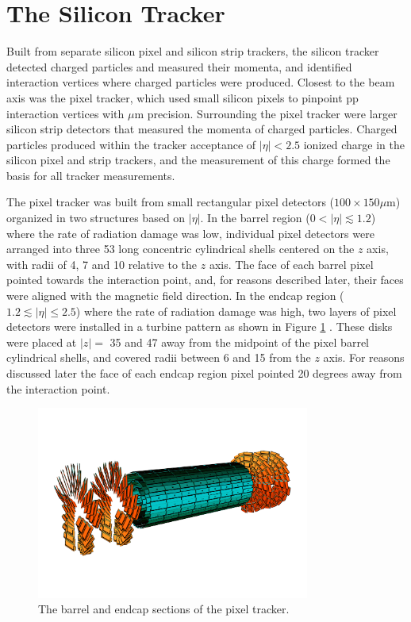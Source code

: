 \section{The Silicon Tracker}
\label{sec:siTrackerDescription}
Built from separate silicon pixel and silicon strip trackers, the silicon tracker detected charged particles  
and measured their momenta, and identified interaction vertices where charged particles were produced.  Closest 
to the beam axis was the pixel tracker, which used small silicon pixels to pinpoint pp interaction vertices 
with $\mu$m precision.  Surrounding the pixel tracker were larger silicon strip detectors that measured the 
momenta of charged particles.  Charged particles produced within the tracker acceptance of $|\eta| < 2.5$ ionized 
charge in the silicon pixel and strip trackers, and the measurement of this charge formed the basis for all tracker 
measurements.

The pixel tracker was built from small rectangular pixel detectors ($100 \times 150 \mu$m) organized in two 
structures based on $|\eta|$.  In the barrel region ($0 < |\eta| \lesssim 1.2$) where the rate of radiation damage was 
low, individual pixel detectors were arranged into three 53 \cm long concentric cylindrical shells centered on the 
$z$ axis, with radii of 4, 7 and 10 \cm relative to the $z$ axis.  The face of each barrel pixel pointed towards the interaction 
point, and, for reasons described later, their faces were aligned with the magnetic field direction.  In the endcap region 
($1.2 \lesssim |\eta| \leq 2.5$) where the rate of radiation damage was high, two layers of pixel detectors were 
installed in a turbine pattern as shown in Figure \ref{fig:pixelTracker} \cite{pixelCommissioning}.  These disks 
were placed at $|z| =$ 35 and 47 \cm away from the midpoint of the pixel barrel cylindrical shells, and covered 
radii between 6 and 15 \cm from the $z$ axis.  For reasons discussed later the face of each endcap region pixel 
pointed 20 degrees away from the interaction point.


\begin{figure}[ht]
	\centering
	\includegraphics[width=0.8\textwidth]{figures/pixelDetectorSchematic.png}
	\caption{The barrel and endcap sections of the pixel tracker.}
	\label{fig:pixelTracker}
\end{figure}

